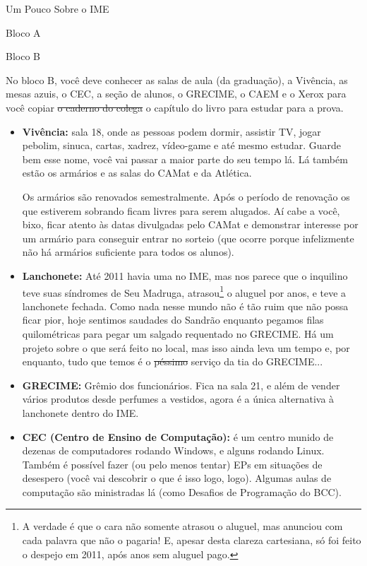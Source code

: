 \begin{secao}{Um Pouco Sobre o IME}
\begin{subsecao}{Bloco A}
\begin{itemize}
\end{itemize}
\end{subsecao}

\begin{subsecao}{Bloco B}

No bloco B, você deve conhecer as salas de aula (da graduação), a Vivência, as
mesas azuis, o CEC, a seção de alunos, o GRECIME, o CAEM e o Xerox para você
copiar \sout{o caderno do colega} o capítulo do livro para estudar para a prova.

\begin{itemize}
\item {\bf Vivência:} sala 18, onde as pessoas podem dormir, assistir TV, jogar pebolim, sinuca, cartas, xadrez, vídeo-game e até mesmo estudar. Guarde bem
esse nome, você vai passar a maior parte do seu tempo lá. Lá também estão os
armários e as salas do CAMat e da Atlética.

Os armários são renovados semestralmente. Após o período de renovação os que estiverem sobrando ficam livres para serem alugados. Aí cabe a você, bixo, ficar atento às datas divulgadas pelo CAMat e demonstrar interesse por um armário para conseguir entrar no sorteio (que ocorre porque infelizmente não há armários suficiente para todos os alunos).

\item {\bf Lanchonete:} Até 2011 havia uma no IME, mas nos parece que o inquilino
teve suas síndromes de Seu Madruga, atrasou\footnote{A verdade é que o cara não
somente atrasou o aluguel, mas anunciou com cada palavra que não o pagaria! E,
apesar desta clareza cartesiana, só foi feito o despejo em 2011, após anos sem
aluguel pago.} o aluguel por anos, e teve a lanchonete fechada. Como nada nesse
mundo não é tão ruim que não possa ficar pior, hoje sentimos saudades do Sandrão
enquanto pegamos filas quilométricas para pegar um salgado requentado no GRECIME.
Há um projeto sobre o que será feito no local, mas isso ainda leva um tempo e, por enquanto,
tudo que temos é o \sout{péssimo} serviço da tia do GRECIME... 

\item {\bf GRECIME:} Grêmio dos funcionários. Fica na sala 21, e além de vender
vários produtos desde perfumes a vestidos, agora é a única alternativa à
lanchonete dentro do IME.

\item {\bf CEC (Centro de Ensino de Computação):} é um centro munido de dezenas
de computadores rodando Windows, e alguns rodando Linux. Também é possível fazer (ou pelo menos tentar)
EPs em situações de desespero (você vai descobrir o que é isso logo, logo). Algumas
aulas de computação são ministradas lá (como Desafios de Programação do BCC).
 

\end{itemize}
\end{subsecao}
\end{secao}
